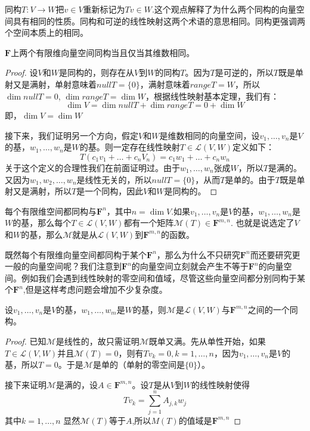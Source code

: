 \documentclass[10pt,a4paper,UTF8]{article}
\begin{document}
同构\(T:V\rightarrow W\)把\(v\in V\)重新标记为\(Tv\in W\).这个观点解释了为什么两个同构的向量空间具有相同的性质。同构和可逆的线性映射这两个术语的意思相同。同构更强调两个空间本质上的相同。

\begin{theorem}
\(\mathbf{F}\)上两个有限维向量空间同构当且仅当其维数相同。
\end{theorem}
\begin{proof}
设\(V\)和\(W\)是同构的，则存在从\(V\)到\(W\)的同构\(T\)。因为\(T\)是可逆的，所以\(T\)既是单射又是满射，单射意味着\(nullT = \{0\}\)，满射意味着\(rangeT = W\)，所以\(\dim nullT = 0\), \(\dim range T = \dim W\)，根据线性映射基本定理，我们有：\[\dim V = \dim nullT + \dim rangeT = 0 + \dim W\]即，\(\dim V = \dim W\)

接下来，我们证明另一个方向，假定\(V\)和\(W\)是维数相同的向量空间，设\(v_{1},\ldots ,v_{n}\)是\(V\)的基，\(w_{1},\ldots ,w_{n}\)是\(W\)的基。则一定存在线性映射\(T\in \mathcal{L}(V,W)\)定义如下：
\[T(c_{1}v_{1} + \ldots + c_{n}V_{n}) = c_{1}w_{1} + \ldots + c_{n}w_{n}\]
关于这个定义的合理性我们在前面证明过。由于\(w_{1},\ldots ,w_{n}\)张成\(W\)，所以\(T\)是满的。又因为\(w_{1},w_{2},\ldots ,w_{n}\)是线性无关的，所以\(nullT = \{0\}\)，从而\(T\)是单的。由于\(T\)既是单射又是满射，所以\(T\)是一个同构，因此\(V\)和\(W\)是同构的。
\end{proof}

每个有限维空间都同构与\(\mathbf{F}^{n}\)，其中\(n = \dim V\).如果\(v_{1},\ldots ,v_{n}\)是\(V\)的基，\(w_{1},\ldots ,w_{n}\)是\(W\)的基，那么每个\(T\in \mathcal{L}(V,W)\)都有一个矩阵\(\mathcal{M}(T) \in \mathbf{F}^{m,n}\). 也就是说选定了\(V\)和\(W\)的基，那么\(\mathcal{M}\)就是从\(\mathcal{L}(V,W)\)到\(\mathbf{F}^{m,n}\)的函数。

既然每个有限维向量空间都同构于某个\(\mathbf{F}^{n}\)，那么为什么不只研究\(\mathbf{F}^{n}\)而还要研究更一般的向量空间呢？我们注意到\(\mathbf{F}^{n}\)的向量空间立刻就会产生不等于\(\mathbf{F}^{n}\)的向量空间。例如我们会遇到线性映射的零空间和值域，尽管这些向量空间都分别同构于某个\(\mathbf{F}^{n}\),但是这样考虑问题会增加不少复杂度。

\begin{theorem}
设\(v_{1},\ldots ,v_{n}\)是\(V\)的基，\(w_{1},\ldots ,w_{m}\)是\(W\)的基，则\(\mathcal{M}\)是\(\mathcal{L}(V,W)\)与\(\mathbf{F}^{m,n}\)之间的一个同构。
\end{theorem}
\begin{proof}
已知\(\mathcal{M}\)是线性的，故只需证明\(\mathcal{M}\)既单又满。先从单性开始，如果\(T\in \mathcal{L}(V,W)\)并且\(\mathcal{M}(T) = 0\)，则有\(Tv_{k} = 0,k=1,\ldots ,n\)，因为\(v_{1},\ldots ,v_{n}\)是\(V\)的基，所以\(T=0\)。于是\(\mathcal{M}\)是单的（单射的零空间是\(\{0\}\)）。

接下来证明\(\mathcal{M}\)是满的，设\(A\in \mathbf{F}^{m,n}\)。设\(T\)是从\(V\)到\(W\)的线性映射使得\[Tv_{k} = \sum_{j=1}^{n}A_{j,k}w_{j}\]其中\(k=1,\ldots ,n\) 显然\(\mathcal{M}(T)\)等于\(A\),所以\(M(T)\)的值域是\(\mathbf{F}^{m,n}\)
\end{proof}
\end{document}

